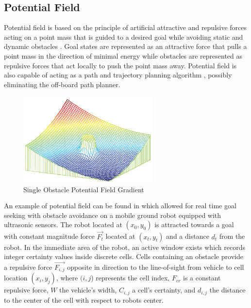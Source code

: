 \documentclass[numbered,pdftex]{ohio-etd}
\begin{document}
\subsection{Potential Field}


Potential field is based on the principle of artificial attractive and repulsive forces acting on a point mass that is guided to a desired goal while avoiding static and dynamic obstacles \cite{khatib_real-time_1986}. Goal states are represented as an attractive force that pulls a point mass in the direction of minimal energy while obstacles are represented as repulsive forces that act locally to push the point mass away. Potential field is also capable of acting as a path and trajectory planning algorithm \cite{rimon_exact_1992}, possibly eliminating the off-board path planner. 

\begin{figure}[H]
	\centering
	\includegraphics[width=7cm]{PaperFigures/pfObstacle}
	\caption{Single Obstacle Potential Field Gradient \cite{liu_virtual-waypoint_2016}}
	\label{fig:pfobstacle}
\end{figure}


An example of potential field can be found in \cite{borenstein_real-time_1990,borenstein_vector_1991,koren_potential_1991} which allowed for real time goal seeking with obstacle avoidance on a mobile ground robot equipped with ultrasonic sensors. The robot located at $(x_0,y_0)$ is attracted towards a goal with constant magnitude force $\overrightarrow{F_t}$ located at $(x_t,y_t)$ and a distance $d_t$ from the robot. In the immediate area of the robot, an active window exists which records integer certainty values inside discrete cells. Cells containing an obstacle provide a repulsive force $\overrightarrow{F_{i,j}}$ opposite in direction to the line-of-sight from vehicle to cell location $(x_i,y_j)$, where $(i,j$) represents the cell index, $F_{cr}$ is a constant repulsive force, $W$ the vehicle's width, $C_{i,j}$ a cell's certainty, and $d_{i,j}$ the distance to the center of the cell with respect to robots center.
\end{document}
